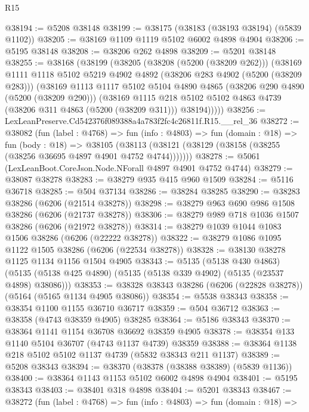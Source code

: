 \begin{lexlean}{R15}
\begin{coremodule}
{{{{{{{{{{{@38194 := @5208 @38148
@38199 := @38175 (@38183 (@38193 @38194) (@5839 @1102))
@38205 := @38169 @1109 @1119 @5102 @6002 @4898 @4904
@38206 := @5195 @38148
@38208 := @38206 @262 @4898
@38209 := @5201 @38148
@38255 := @38168
    (@38199
      (@38205
        (@38208 (@5200 (@38209 @262)))
        (@38169
          @1111
          @1118
          @5102
          @5219
          @4902
          @4892
          (@38206 @283 @4902 (@5200 (@38209 @283)))
          (@38169
            @1113
            @1117
            @5102
            @5104
            @4890
            @4865
            (@38206 @290 @4890 (@5200 (@38209 @290)))
            (@38169
              @1115
              @218
              @5102
              @5102
              @4863
              @4739
              (@38206 @311 @4863 (@5200 (@38209 @311)))
              @38194)))))
@38256 := LexLeanPreserve.Cd542376f089388a4a783f2fc4c26811f.R15.__rel_36
@38272 := @38082
    (fun (label : @4768) =>
    fun (info : @4803) =>
    fun (domain : @18) =>
    fun (body : @18) =>
    @38105 (@38113 (@38121 (@38129 (@38158 (@38255 (@38256 @36695 @4897 @4901 @4752 @4744)))))))
@38278 := @5061 (LexLeanBoot.CoreJson.Node.NForall @4897 @4901 @4752 @4744)
@38279 := @38087 @38278
@38283 := @38279 @935 @415 @960 @1509
@38284 := @5116 @36718
@38285 := @504 @37134
@38286 := @38284 @38285
@38290 := @38283 @38286 (@6206 (@21514 @38278))
@38298 := @38279 @963 @690 @986 @1508 @38286 (@6206 (@21737 @38278))
@38306 := @38279 @989 @718 @1036 @1507 @38286 (@6206 (@21972 @38278))
@38314 := @38279 @1039 @1044 @1083 @1506 @38286 (@6206 (@22222 @38278))
@38322 := @38279 @1086 @1095 @1122 @1505 @38286 (@6206 (@22534 @38278))
@38328 := @38130 @38278 @1125 @1134 @1156 @1504 @4905
@38343 := @5135
    (@5138 @430 @4863)
    (@5135 (@5138 @425 @4890) (@5135 (@5138 @339 @4902) (@5135 (@23537 @4898) @38086)))
@38353 := @38328 @38343 @38286 (@6206 (@22828 @38278)) (@5164 (@5165 @1134 @4905 @38086))
@38354 := @5538 @38343
@38358 := @38354 @1100 @1155 @36710 @36717
@38359 := @504 @36712
@38363 := @38358 (@4743 @38359 @4905) @38285
@38364 := @5186 @38343
@38370 := @38364 @1141 @1154 @36708 @36692 @38359 @4905
@38378 := @38354 @133 @1140 @5104 @36707 (@4743 @1137 @4739) @38359
@38388 := @38364 @1138 @218 @5102 @5102 @1137 @4739 (@5832 @38343 @211 @1137)
@38389 := @5208 @38343
@38394 := @38370 (@38378 (@38388 @38389) (@5839 @1136))
@38400 := @38364 @1143 @1153 @5102 @6002 @4898 @4904
@38401 := @5195 @38343
@38403 := @38401 @318 @4898
@38404 := @5201 @38343
@38467 := @38272
    (fun (label : @4768) =>
    fun (info : @4803) =>
    fun (domain : @18) =>
}}}}}}}}}}}
\end{coremodule}
\end{lexlean}
